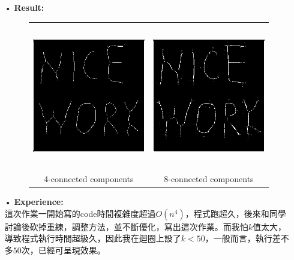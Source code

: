 \documentclass[12pt,a4paper]{article}
\begin{document}
\begin{enumerate}
\item[•]
{\bf Result:}
\begin{figure}[h]
\hspace*{5em}
\begin{tabular}{cc}
\includegraphics[height=2.5in]
{4-connected components.jpg}&
\includegraphics[height=2.5in]
{8-connected components.jpg}\\
4-connected components & 8-connected components
\end{tabular}
\end{figure}


\item[•]
{\bf Experience:}\\
這次作業一開始寫的code時間複雜度超過$O(n^4)$，程式跑超久，後來和同學討論後砍掉重練，調整方法，並不斷優化，寫出這次作業。而我怕$k$值太大，導致程式執行時間超級久，因此我在迴圈上設了$k<50$，一般而言，執行差不多$50$次，已經可呈現效果。
\end{enumerate}
\end{document}

